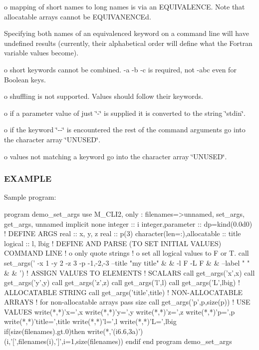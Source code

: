 o mapping of short names to long names is via an E\+Q\+U\+I\+V\+A\+L\+E\+N\+CE. Note that allocatable arrays cannot be E\+Q\+U\+I\+V\+A\+N\+E\+N\+C\+Ed.

Specifying both names of an equivalenced keyword on a command line will have undefined results (currently, their alphabetical order will define what the Fortran variable values become).

o short keywords cannot be combined. -\/a -\/b -\/c is required, not -\/abc even for Boolean keys.

o shuffling is not supported. Values should follow their keywords.

o if a parameter value of just \char`\"{}-\/\char`\"{} is supplied it is converted to the string \char`\"{}stdin\char`\"{}.

o if the keyword \char`\"{}-\/-\/\char`\"{} is encountered the rest of the command arguments go into the character array \char`\"{}\+U\+N\+U\+S\+E\+D\char`\"{}.

o values not matching a keyword go into the character array \char`\"{}\+U\+N\+U\+S\+E\+D\char`\"{}.

\subsubsection*{E\+X\+A\+M\+P\+LE}

Sample program\+: \begin{DoxyVerb}program demo_set_args
use M_CLI2,  only : filenames=>unnamed, set_args, get_args, unnamed
implicit none
integer                      :: i
integer,parameter            :: dp=kind(0.0d0)
! DEFINE ARGS
real                         :: x, y, z
real                         :: p(3)
character(len=:),allocatable :: title
logical                      :: l, lbig
!  DEFINE AND PARSE (TO SET INITIAL VALUES) COMMAND LINE
!   o only quote strings
!   o set all logical values to F or T.
call set_args(' -x 1 -y 2 -z 3 -p -1,-2,-3 --title "my title" &
        & -l F -L F &
        & --label " " &
        & ')
! ASSIGN VALUES TO ELEMENTS
! SCALARS
call get_args('x',x)
call get_args('y',y)
call get_args('z',z)
call get_args('l',l)
call get_args('L',lbig)
! ALLOCATABLE STRING
call get_args('title',title)
! NON-ALLOCATABLE ARRAYS
! for non-allocatable arrays pass size
call get_args('p',p,size(p))
! USE VALUES
write(*,*)'x=',x
write(*,*)'y=',y
write(*,*)'z=',z
write(*,*)'p=',p
write(*,*)'title=',title
write(*,*)'l=',l
write(*,*)'L=',lbig
if(size(filenames).gt.0)then
   write(*,'(i6.6,3a)')(i,'[',filenames(i),']',i=1,size(filenames))
endif
end program demo_set_args
\end{DoxyVerb}
